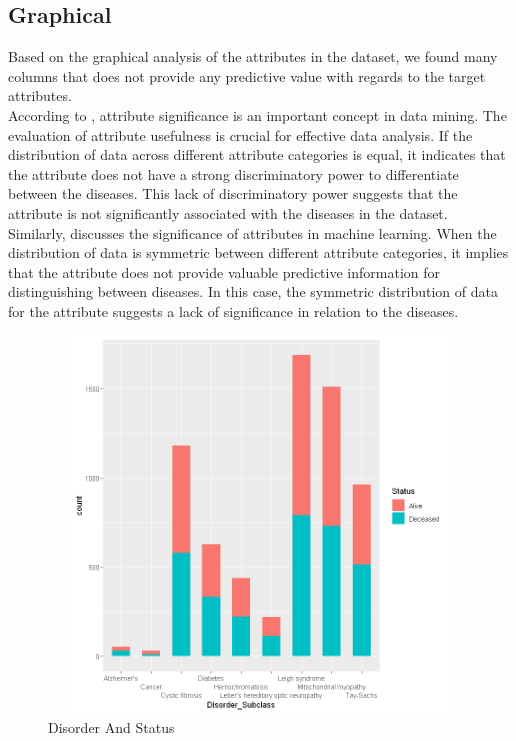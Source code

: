 \subsection{Graphical}
Based on the graphical analysis of the attributes in the dataset, we found many columns that does not provide any predictive value with regards to the target attributes.\\
\noindent
According to \cite{han2011data}, attribute significance is an important concept in data mining. The evaluation of attribute usefulness is crucial for effective data analysis. If the distribution of data across different attribute categories is equal, it indicates that the attribute does not have a strong discriminatory power to differentiate between the diseases. This lack of discriminatory power suggests that the attribute is not significantly associated with the diseases in the dataset.\\
\noindent
Similarly, \cite{mitchell1997machine} discusses the significance of attributes in machine learning. When the distribution of data is symmetric between different attribute categories, it implies that the attribute does not provide valuable predictive information for distinguishing between diseases. In this case, the symmetric distribution of data for the attribute suggests a lack of significance in relation to the diseases.\\

\begin{figure}[htpb]
	\centering
	\includegraphics[height=10cm, width=12cm]{figures/Status.png}
	\caption{Disorder And Status}
	\label{fig 4}
\end{figure}

